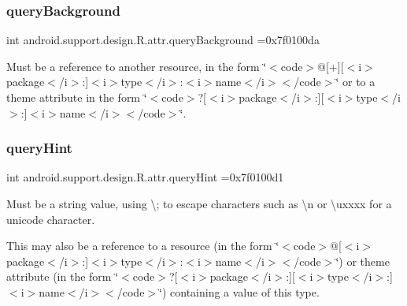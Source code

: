 \subsubsection{\texorpdfstring{query\+Background}{queryBackground}}
{\footnotesize\ttfamily int android.\+support.\+design.\+R.\+attr.\+query\+Background =0x7f0100da\hspace{0.3cm}{\ttfamily [static]}}

Must be a reference to another resource, in the form \char`\"{}$<$code$>$@\mbox{[}+\mbox{]}\mbox{[}$<$i$>$package$<$/i$>$\+:\mbox{]}$<$i$>$type$<$/i$>$\+:$<$i$>$name$<$/i$>$$<$/code$>$\char`\"{} or to a theme attribute in the form \char`\"{}$<$code$>$?\mbox{[}$<$i$>$package$<$/i$>$\+:\mbox{]}\mbox{[}$<$i$>$type$<$/i$>$\+:\mbox{]}$<$i$>$name$<$/i$>$$<$/code$>$\char`\"{}. \mbox{\label{classandroid_1_1support_1_1design_1_1R_1_1attr_a7c779885d4f7e8381f2dbfbd244c5470}} 
\subsubsection{\texorpdfstring{query\+Hint}{queryHint}}
{\footnotesize\ttfamily int android.\+support.\+design.\+R.\+attr.\+query\+Hint =0x7f0100d1\hspace{0.3cm}{\ttfamily [static]}}

Must be a string value, using \textquotesingle{}\textbackslash{};\textquotesingle{} to escape characters such as \textquotesingle{}\textbackslash{}n\textquotesingle{} or \textquotesingle{}\textbackslash{}uxxxx\textquotesingle{} for a unicode character. 

This may also be a reference to a resource (in the form \char`\"{}$<$code$>$@\mbox{[}$<$i$>$package$<$/i$>$\+:\mbox{]}$<$i$>$type$<$/i$>$\+:$<$i$>$name$<$/i$>$$<$/code$>$\char`\"{}) or theme attribute (in the form \char`\"{}$<$code$>$?\mbox{[}$<$i$>$package$<$/i$>$\+:\mbox{]}\mbox{[}$<$i$>$type$<$/i$>$\+:\mbox{]}$<$i$>$name$<$/i$>$$<$/code$>$\char`\"{}) containing a value of this type. \mbox{\label{classandroid_1_1support_1_1design_1_1R_1_1attr_ac48d1073bda75cb7de2a7a4c3561389e}} 
